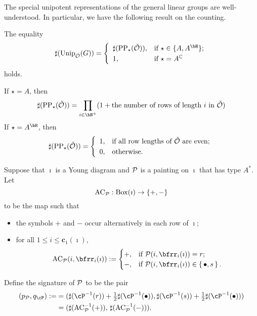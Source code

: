 \documentclass[counting_main.tex]{subfiles}
\begin{document}
 The special unipotent representations of the general linear groups are well-understood. In particular, we have the following result on the counting.
\begin{thm}
The equality
\[
\sharp(\Unip_{\check \CO}(G))= \left\{
     \begin{array}{ll}
        \sharp(\mathrm{PP}_\star(\check \CO)), &\hbox{if $\star\in\{A, A^\bH\}$}; \smallskip\\
           1, &\hbox{if $\star=A^\C$}  \end{array}
   \right.
\]
holds.

\end{thm}
\begin{remark}
If $\star=A$, then
\[
\sharp(\mathrm{PP}_\star(\check \CO))=\prod_{i\in \bN^+} (1+\textrm{the number of rows of length $i$ in $\check \CO$})
\]
If
 $\star=A^\bH$, then
\[
\sharp(\mathrm{PP}_\star(\check \CO))= \left\{
     \begin{array}{ll}
        1, &\hbox{if all row lengths of $\check \CO$ are even}; \smallskip\\
           0, &\hbox{otherwise}.  \end{array}
   \right.
\]

\end{remark}

Suppose that $\imath$ is a Young diagram and $\mathcal{P}$ is a painting on  $\imath$ that has type $A^*$. Let $$\mathrm{AC}_{\mathcal{P}}: \mathrm{Box}(\imath)\rightarrow \{+, -\}$$ to be the map such that
  \begin{itemize}
    \item the symbols $+$ and $-$ occur alternatively in each row of $\imath$;
    \item for all $1\leq i\leq \mathbf c_1(\imath) $,
    \[
       \mathrm{AC}_\CP (i,\bfrr_i(\imath)) := \begin{cases}
    +,  & \text{if  }\CP(i,\bfrr_i(\imath))=r;\\
    -,  & \text{if } \CP(i,\bfrr_i(\imath))\in \set{\bullet,s}.
  \end{cases}
    \]
  \end{itemize}
Define the signature of $\mathcal{P}$ to be the pair
\[
  \begin{split}
    (p_\CP, q_\cP):=
    &= (\sharp(\cP^{-1}(r))+\half \sharp(\cP^{-1}(\bullet)),\sharp(\cP^{-1}(s))
    + \half \sharp(\cP^{-1}(\bullet)))\\
    &=
    (\sharp( \mathrm{AC}_\CP^{-1}(+)),\, \sharp( \mathrm{AC}_\CP^{-1}(-))).\\
  \end{split}
\]
\end{document}
